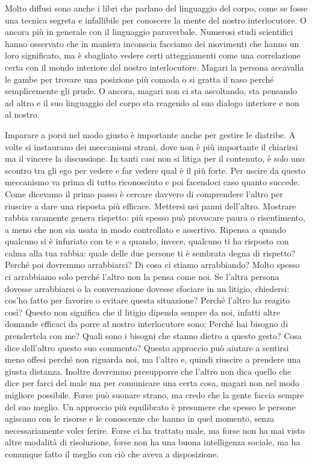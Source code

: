 \documentclass[12pt]{book} %
\begin{document}
Molto diffusi sono anche i libri che parlano del linguaggio del corpo, come se fosse una tecnica segreta e infallibile
per conoscere la mente del nostro interlocutore. O ancora più in generale con il linguaggio paraverbale. Numerosi studi
scientifici hanno osservato che in maniera inconscia facciamo dei movimenti che hanno un loro significato, ma è
sbagliato vedere certi atteggiamenti come una correlazione certa con il mondo interiore del nostro interlocutore.
Magari la persona accavalla le gambe per trovare una posizione più comoda o si gratta il naso perché semplicemente gli
prude. O ancora, magari non ci sta ascoltando, sta pensando ad altro e il suo linguaggio del corpo sta reagendo al suo
dialogo interiore e non al nostro.

Imparare a porsi nel modo giusto è importante anche per gestire le diatribe. A volte si instaurano dei meccanismi
strani, dove non è più importante il chiarirsi ma il vincere la discussione. 
In tanti casi non si litiga per il contenuto, è solo uno scontro tra gli ego per vedere e far vedere qual è il più forte. 
Per uscire da questo meccanismo va prima di tutto riconosciuto e poi facendoci caso quanto
succede. Come dicevamo il primo passo è cercare davvero di comprendere l'altro per riuscire a dare
una risposta più efficace. Mettersi nei panni dell'altro. 
Mostrare rabbia raramente genera rispetto: più spesso può provocare paura o risentimento, a meno che non sia usata in modo controllato e assertivo. Ripensa a quando qualcuno si è infuriato con te e a quando, invece, qualcuno ti ha risposto con calma alla tua rabbia: quale delle due persone ti è sembrata degna di rispetto? 
Perché poi dovremmo arrabbiarci? Di cosa ci stiamo arrabbiando? Molto spesso ci arrabbiamo solo perché l'altro non la pensa come noi.
Se l'altra persona dovesse arrabbiarsi o la conversazione dovesse sfociare in un litigio, chiedersi: cos'ho fatto per favorire o evitare questa
situazione? Perché l'altro ha reagito così? 
Questo non significa che il litigio dipenda sempre da noi, infatti altre domande efficaci da porre al nostro interlocutore sono:
Perché hai bisogno di prendertela con me? Quali sono i bisogni che stanno dietro a questo gesto?
Cosa dice dell'altro questo suo commento?
Questo approccio può aiutare a sentirsi meno offesi perché non riguarda noi, ma l'altro e, quindi riuscire a prendere una giusta distanza.
Inoltre dovremmo presupporre che l'altro non dica quello che dice per farci del male ma per comunicare una certa cosa, magari non nel modo migliore possibile. 
Forse può suonare strano, ma credo che la gente faccia sempre del suo meglio. Un approccio più equilibrato è presumere che spesso le persone agiscano con le risorse e le conoscenze che hanno in quel momento, senza necessariamente voler ferire. Forse ci ha trattato male, ma forse non ha mai visto altre modalità di risoluzione, forse non ha una buona intelligenza sociale, ma ha comunque fatto il meglio con ciò che aveva a disposizione.
\end{document}
